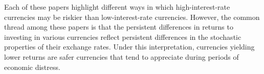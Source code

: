 Each of these papers highlight different ways in which
high-interest-rate currencies may be riskier than low-interest-rate
currencies. However, the common thread among these papers is that the
persistent differences in returns to investing in various currencies
reflect persistent differences in the stochastic properties of their
exchange rates. Under this interpretation, currencies yielding lower
returns are safer currencies that tend to appreciate during periods of
economic distress.